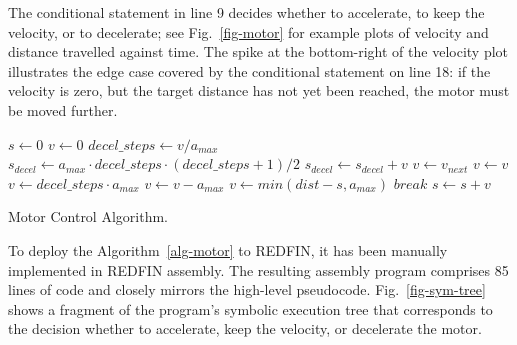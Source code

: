 The conditional statement in line 9 decides whether
to accelerate, to keep the velocity, or to decelerate;
see Fig.~\ref{fig-motor} for example plots of velocity and distance travelled
against time. The spike at the bottom-right of the velocity plot illustrates
the edge case covered by the conditional statement on line 18: if the velocity
is zero, but the target distance has not yet been reached, the motor must be
moved further.

\begin{algorithm}[h]
  \begin{algorithmic}[1]
\State $s \gets 0$
\State $v \gets 0$
  \State $decel\_steps\gets v / a_{max}$
  \State $s_{decel} \gets a_{max} \cdot decel\_steps \cdot (decel\_steps + 1) / 2$
    \State $s_{decel} \gets s_{decel} + v$
  \EndIf
    \State $v \gets v_{next}$ 
    \State $ v \gets v $     
  \Else
      \State $v \gets decel\_steps \cdot a_{max}$
    \Else
      \State $v \gets v - a_{max}$
      \EndIf
  \EndIf
      
      \State $v \gets min(dist - s, a_{max})$
    \Else
      \State $break$  
      \EndIf
      \EndIf
  \State $s \gets s + v$
\EndWhile
\end{algorithmic}
\caption{Motor Control Algorithm.\label{alg-motor}}
\end{algorithm}

To deploy the Algorithm~\ref{alg-motor} to REDFIN, it has been manually
implemented in REDFIN assembly. The resulting assembly program comprises 85 lines of
code and closely mirrors the high-level pseudocode. Fig.~\ref{fig-sym-tree} shows
a fragment of the program's symbolic execution tree that corresponds to the
decision whether to accelerate, keep the velocity, or decelerate the motor.

